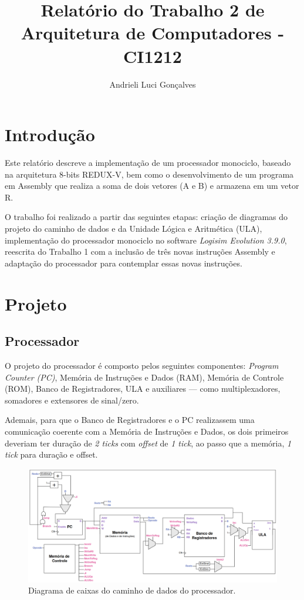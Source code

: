 \documentclass[twocolumn, 11pt]{article}
\author{Andrieli Luci Gonçalves}
\title{Relatório do Trabalho 2 de Arquitetura de Computadores - CI1212}
\begin{document}
\maketitle        

\section{Introdução}

Este relatório descreve a implementação de um processador monociclo, baseado na arquitetura 8-bits REDUX-V, bem como o desenvolvimento de um programa em Assembly que realiza a soma de dois vetores (A e B) e armazena em um vetor R.

O trabalho foi realizado a partir das seguintes etapas: criação de diagramas do projeto do caminho de dados e da Unidade Lógica e Aritmética (ULA), implementação do processador monociclo no software \textit{Logisim Evolution 3.9.0}, reescrita do Trabalho 1 com a inclusão de três novas instruções Assembly e adaptação do processador para contemplar essas novas instruções. 

\section{Projeto}

\subsection{Processador}

O projeto do processador é composto pelos seguintes componentes: \textit{Program Counter (PC)}, Memória de Instruções e Dados (RAM), Memória de Controle (ROM), Banco de Registradores, ULA e auxiliares — como multiplexadores, somadores e extensores de sinal/zero.

Ademais, para que o Banco de Registradores e o PC realizassem uma comunicação coerente com a Memória de Instruções e Dados, os dois primeiros deveriam ter duração de \textit{2 ticks} com \textit{offset} de \textit{1 tick}, ao passo que a memória, \textit{1 tick} para duração e offset.

\begin{figure}[h]
    \centering
    \includegraphics[width=0.9\linewidth]{datapath_processador.png}
    \caption{Diagrama de caixas do caminho de dados do processador.}
    \label{fig:enter-label}
\end{figure}
\end{document}
